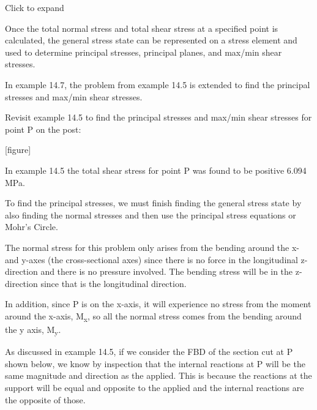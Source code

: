 \documentclass[
  letterpaper,
  DIV=11,
  numbers=noendperiod]{scrreprt}
\theoremstyle{definition}
\theoremstyle{remark}
\begin{document}
Click to expand

Once the total normal stress and total shear stress at a specified point
is calculated, the general stress state can be represented on a stress
element and used to determine principal stresses, principal planes, and
max/min shear stresses.

In example 14.7, the problem from example 14.5 is extended to find the
principal stresses and max/min shear stresses.

\begin{tcolorbox}[enhanced jigsaw, leftrule=.75mm, colbacktitle=quarto-callout-tip-color!10!white, breakable, opacityback=0, colback=white, titlerule=0mm, toprule=.15mm, colframe=quarto-callout-tip-color-frame, coltitle=black, title={Example 14.7}, toptitle=1mm, bottomrule=.15mm, rightrule=.15mm, left=2mm, arc=.35mm, opacitybacktitle=0.6, bottomtitle=1mm]

Revisit example 14.5 to find the principal stresses and max/min shear
stresses for point P on the post:

{[}figure{]}

\begin{tcolorbox}[enhanced jigsaw, leftrule=.75mm, colbacktitle=quarto-callout-tip-color!10!white, breakable, opacityback=0, colback=white, titlerule=0mm, toprule=.15mm, colframe=quarto-callout-tip-color-frame, coltitle=black, title={Solution}, toptitle=1mm, bottomrule=.15mm, rightrule=.15mm, left=2mm, arc=.35mm, opacitybacktitle=0.6, bottomtitle=1mm]

In example 14.5 the total shear stress for point P was found to be
positive 6.094 MPa.

To find the principal stresses, we must finish finding the general
stress state by also finding the normal stresses and then use the
principal stress equations or Mohr's Circle.

The normal stress for this problem only arises from the bending around
the x- and y-axes (the cross-sectional axes) since there is no force in
the longitudinal z-direction and there is no pressure involved. The
bending stress will be in the z-direction since that is the longitudinal
direction.

In addition, since P is on the x-axis, it will experience no stress from
the moment around the x-axis, M\textsubscript{x}, so all the normal
stress comes from the bending around the y axis, M\textsubscript{y}.

As discussed in example 14.5, if we consider the FBD of the section cut
at P shown below, we know by inspection that the internal reactions at P
will be the same magnitude and direction as the applied. This is because
the reactions at the support will be equal and opposite to the applied
and the internal reactions are the opposite of those.


\end{tcolorbox}
\end{tcolorbox}
\end{document}

